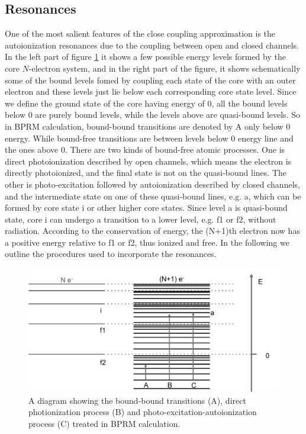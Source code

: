 \subsection{Resonances}
One of the most salient features of the close coupling approximation is the autoionization resonances due to the coupling between open and closed channels. In the left part of figure \ref{figure_resonance_theory} it  shows a few possible energy levels formed by the core $N$-electron system, and in the right part of the figure, it shows schematically some of the bound levels fomed by coupling each state of the core with an outer electron and these levels just lie below each corresponding core state level. Since we define the ground state of the core having energy of 0, all the bound levels below 0 are purely bound levels, while the levels above are quasi-bound levels. So in BPRM calculation, bound-bound transitions are denoted by A only below 0 energy. While bound-free transitions are between levels below 0 energy line and the ones above 0. There are two kinds of bound-free atomic processes. One is direct photoionization described by open channels, which means the electron is directly photoionized, and the final state is not on the quasi-bound lines. The other is photo-excitation followed by autoionization described by closed channels, and the intermediate state on one of these quasi-bound lines, e.g. a, which can be formed by core state i or other higher core states. Since level a is quasi-bound state, core i can undergo a transition to a lower level, e.g. f1 or f2, without radiation. According to the conservation of energy, the (N+1)th electron now has a positive energy relative to f1 or f2, thus ionized and free. In the following we outline the procedures used to incorporate the resonances.

\begin{figure}
	\centering
	\includegraphics[width=.9\textwidth]{figures_chap_4/resonances_theory}	
	\caption{A diagram showing the bound-bound transitions (A), direct photionization process (B) and photo-excitation-autoionization process (C) treated in BPRM calculation.}
	\label{figure_resonance_theory}
\end{figure}

